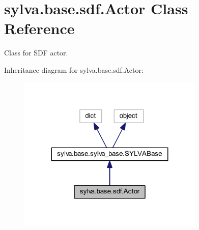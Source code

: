 \hypertarget{classsylva_1_1base_1_1sdf_1_1_actor}{}\section{sylva.\+base.\+sdf.\+Actor Class Reference}
\label{classsylva_1_1base_1_1sdf_1_1_actor}


Class for S\+DF actor.  




Inheritance diagram for sylva.\+base.\+sdf.\+Actor\+:\nopagebreak
\begin{figure}[H]
\begin{center}
\leavevmode
\includegraphics[width=251pt]{classsylva_1_1base_1_1sdf_1_1_actor__inherit__graph}
\end{center}
\end{figure}
